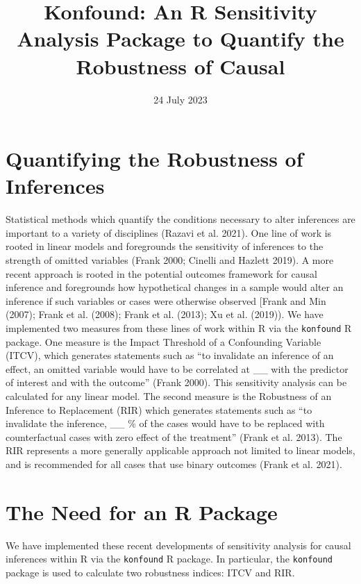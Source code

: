 \documentclass[
]{article}
\title{Konfound: An R Sensitivity Analysis Package to Quantify the
Robustness of Causal}
\author{}
\date{\vspace{-2.5em}24 July 2023}
\begin{document}
\maketitle

\hypertarget{quantifying-the-robustness-of-inferences}{%
\section{Quantifying the Robustness of
Inferences}\label{quantifying-the-robustness-of-inferences}}

Statistical methods which quantify the conditions necessary to alter
inferences are important to a variety of disciplines (Razavi et al.
2021). One line of work is rooted in linear models and foregrounds the
sensitivity of inferences to the strength of omitted variables (Frank
2000; Cinelli and Hazlett 2019). A more recent approach is rooted in the
potential outcomes framework for causal inference and foregrounds how
hypothetical changes in a sample would alter an inference if such
variables or cases were otherwise observed {[}Frank and Min (2007);
Frank et al. (2008); Frank et al. (2013); Xu et al. (2019)). We have
implemented two measures from these lines of work within R via the
\texttt{konfound} R package. One measure is the Impact Threshold of a
Confounding Variable (ITCV), which generates statements such as ``to
invalidate an inference of an effect, an omitted variable would have to
be correlated at \_\_ with the predictor of interest and with the
outcome'' (Frank 2000). This sensitivity analysis can be calculated for
any linear model. The second measure is the Robustness of an Inference
to Replacement (RIR) which generates statements such as ``to invalidate
the inference, \_\_ \% of the cases would have to be replaced with
counterfactual cases with zero effect of the treatment'' (Frank et al.
2013). The RIR represents a more generally applicable approach not
limited to linear models, and is recommended for all cases that use
binary outcomes (Frank et al. 2021).

\hypertarget{the-need-for-an-r-package}{%
\section{The Need for an R Package}\label{the-need-for-an-r-package}}

We have implemented these recent developments of sensitivity analysis
for causal inferences within R via the \texttt{konfound} R package. In
particular, the \texttt{konfound} package is used to calculate two
robustness indices: ITCV and RIR.
\end{document}

